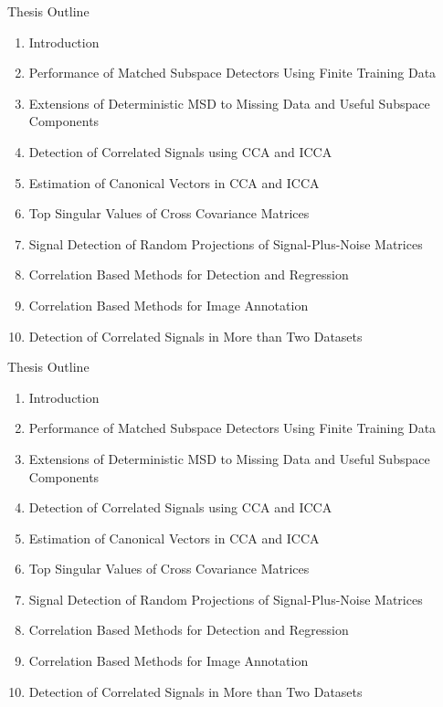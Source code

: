 \documentclass[8pt]{beamer}
\begin{document}
\begin{frame}{Thesis Outline}

  \begin{enumerate}
  \item Introduction
  \item Performance of Matched Subspace Detectors Using Finite Training Data
  \item Extensions of Deterministic MSD to Missing Data and Useful Subspace Components
  \item Detection of Correlated Signals using CCA and ICCA
  \item Estimation of Canonical Vectors in CCA and ICCA
  \item Top Singular Values of Cross Covariance Matrices
  \item Signal Detection of Random Projections of Signal-Plus-Noise Matrices
  \item Correlation Based Methods for Detection and Regression
  \item Correlation Based Methods for Image Annotation
  \item Detection of Correlated Signals in More than Two Datasets
  \end{enumerate}

\end{frame}

\begin{frame}{Thesis Outline}
  \addtocounter{framenumber}{-1}
  \begin{enumerate}
  \item \textcolor{textlightgray}{Introduction}
  \item \textcolor{textlightgray}{Performance of Matched Subspace Detectors Using Finite
      Training Data} 
  \item \textcolor{textlightgray}{Extensions of Deterministic MSD to Missing Data and
      Useful Subspace Components} 
  \item {\color{textred}Detection of Correlated Signals using CCA and ICCA}
  \item \textcolor{textlightgray}{Estimation of Canonical Vectors in CCA and ICCA}
  \item \textcolor{textred}{Top Singular Values of Cross Covariance Matrices}
  \item \textcolor{textred}{Signal Detection of Random Projections of
      Signal-Plus-Noise Matrices} 
  \item \textcolor{textlightgray}{Correlation Based Methods for Detection and Regression} 
  \item \textcolor{textred}{Correlation Based Methods for Image Annotation}
  \item \textcolor{textred}{Detection of Correlated Signals in More than Two Datasets}
  \end{enumerate}

\end{frame}
\end{document}
